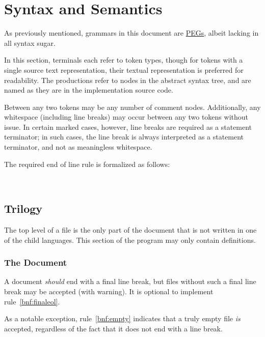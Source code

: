 \section{Syntax and Semantics}
\label{sec:syntax}

As previously mentioned, grammars in this document are
\href{https://en.wikipedia.org/wiki/Parsing_expression_grammar}{PEGs},
albeit lacking in all syntax sugar.

In this section, terminals each refer to token types, though for tokens
with a single source text representation, their textual representation
is preferred for readability. The productions refer to nodes in the
abstract syntax tree, and are named as they are in the implementation
source code.

Between any two tokens may be any number of comment nodes. Additionally,
any whitespace (including line breaks) may occur between any two tokens
without issue. In certain marked cases, however, line breaks are required
as a statement terminator; in such cases, the line break is always interpreted
as a statement terminator, and not as meaningless whitespace.

The required end of line rule is formalized as follows:

\begin{bnf*}
     \\
\end{bnf*}

\subsection{Trilogy}

The top level of a \Trilogy{} file is the only part of the document that
is not written in one of the child languages. This section of the program
may only contain definitions.

\subsubsection{The Document}

A \Trilogy{} document \emph{should} end with a final line break,
but files without such a final line break may be accepted (with warning).
It is optional to implement rule~\ref{bnf:finaleol}.

As a notable exception, rule~\ref{bnf:empty} indicates that a truly empty
file \emph{is} accepted, regardless of the fact that it does not end with
a line break.

